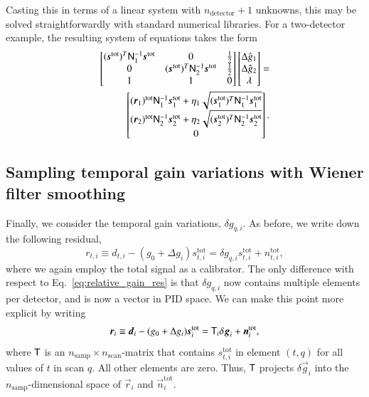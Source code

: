 \documentclass[twocolumn]{aa}
\renewcommand{\d}[0]{\vec{d}}
\newcommand{\n}[0]{\vec{n}}
\newcommand{\s}[0]{\vec{s}}
\newcommand{\T}[0]{\tens{T}}
\newcommand{\g}[0]{\vec{g}}
\newcommand{\N}[0]{\tens{N}}
\renewcommand{\r}[0]{\vec{r}}
\newcommand{\ti}[0]{_{t, i}}
\newcommand{\qi}[0]{_{q, i}}
\newcommand{\tot}[0]{^{\mathrm{tot}}}
\begin{document}
Casting this in terms of a linear system with $n_{\mathrm{detector}}
+1$ unknowns, this may be solved straightforwardly with standard
numerical libraries. For a two-detector example, the resulting system
of equations takes the form
\begin{align}
    \begin{bmatrix}
        (\s^{\mathrm{tot}})^T \N_1^{-1} \s^{\mathrm{tot}} & 0 & \frac{1}{2} \\
        0 &(\s^{\mathrm{tot}})^T \N_2^{-1} \s^{\mathrm{tot}} & \frac{1}{2} \\
        1 & 1 & 0
    \end{bmatrix}
    \begin{bmatrix}
        \Delta \hat{g}_1 \\
        \Delta \hat{g}_2 \\
        \lambda
    \end{bmatrix}
    = \\ 
    \begin{bmatrix}
        (\r_1)^{\mathrm{tot}} \N_1^{-1}\s_1^{\mathrm{tot}} + \eta_1\sqrt{(\s_1\tot)^T\N_1^{-1}\s_1\tot}\\
        (\r_2)^{\mathrm{tot}} \N_2^{-1}\s_2^{\mathrm{tot}} + \eta_2\sqrt{(\s_2\tot)^T\N_2^{-1}\s_2\tot}\\
        0
    \end{bmatrix}.
    \label{eq:relative_gain_sampling}
\end{align}

\subsection{Sampling temporal gain variations with Wiener filter smoothing}
\label{sec:temporal_var_sampling}
Finally, we consider the temporal gain variations, $\delta g\qi$. As
before, we write down the following residual,
\begin{equation}
    r_{t,i}\equiv d_{t,i} - (g_0 + \Delta g_i)s\ti\tot = \delta g\qi s\ti\tot + n\ti\tot,
    \label{eq:delta_gain_residual}
\end{equation}
where we again employ the total signal as a calibrator. The only
difference with respect to Eq.~\eqref{eq:relative_gain_res} is that
$\delta g\qi$ now contains multiple elements per detector, and is now
a vector in PID space. We can make this point more explicit by writing
\begin{equation}
    \r_i \equiv \d_i - (g_0 + \Delta g_i)\s_i\tot = \T_i\delta \g_i + \n_i\tot,
\end{equation}
where $\T$ is an $n_{\mathrm{samp}}\times n_{\mathrm{scan}}$-matrix
that contains $s\ti\tot$ in element $(t,q)$ for all values of $t$ in
scan $q$. All other elements are zero. Thus, $\T$ projects $\delta \g_i$
into the $n_{\mathrm{samp}}$-dimensional space of $\r_i$ and
$\n_i\tot$.
\end{document}
